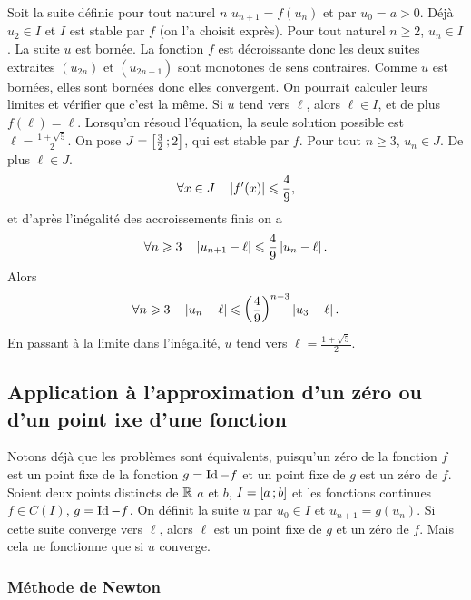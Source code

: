 Soit la suite définie pour tout naturel $n$ $u_{n+1}=f(u_n)$ et par $u_0 = a>0$. Déjà $u_2 \in I$ et $I$ est stable par $f$ (on l'a choisit exprès). Pour tout naturel $n \geqslant 2$, $u_n \in I$. La suite $u$ est bornée. La fonction $f$ est décroissante donc les deux suites extraites $(u_{2n})$ et $(u_{2n+1})$ sont monotones de sens contraires. Comme $u$ est bornées, elles sont bornées donc elles convergent. On pourrait calculer leurs limites et vérifier que c'est la même. Si $u$ tend vers $\ell$, alors $\ell \in I$, et de plus $f(\ell)=\ell$. Lorsqu'on résoud l'équation, la seule solution possible est $\ell=\frac{1+\sqrt{5}}{2}$. On pose $J=\left[ \frac{3}{2} \, ;  2 \right]$, qui est stable par $f$. Pour tout $n \geqslant 3$, $u_n \in J$. De plus $\ell \in J$.
\begin{equation}
  \forall x \in J \quad \left\lvert f'(x)\right\rvert\leqslant \frac{4}{9},
\end{equation}
et d'après l'inégalité des accroissements finis on a
\begin{equation}
 \forall n \geqslant 3 \quad \left\lvert u_{n+1}-\ell\right\rvert  \leqslant \frac{4}{9} \left\lvert u_n-\ell\right\rvert.
\end{equation}
Alors
\begin{equation}
  \forall n \geqslant 3 \quad \left\lvert u_n-\ell\right\rvert \leqslant \left(\frac{4}{9}\right)^{n-3}\left\lvert u_3-\ell\right\rvert.
\end{equation}
En passant à la limite dans l'inégalité, $u$ tend vers $\ell=\frac{1+\sqrt{5}}{2}$.

\subsection{Application à l'approximation d'un zéro ou d'un point ixe d'une fonction}

Notons déjà que les problèmes sont équivalents, puisqu'un zéro de la fonction $f$ est un point fixe de la fonction $g=\operatorname{Id}-f$ et un point fixe de $g$ est un zéro de $f$. Soient deux points distincts de $\mathbb{R}$ $a$ et $b$, $I=\left[ a \, ;  b \right]$ et les fonctions continues $f \in \mathit{C}(I)$, $g=\operatorname{Id} - f$. On définit la suite $u$ par $u_0 \in I$ et $u_{n+1}=g(u_n)$. Si cette suite converge vers $\ell$, alors $\ell$ est un point fixe de $g$ et un zéro de $f$. Mais cela ne fonctionne que si $u$ converge.

\subsubsection{Méthode de Newton}

